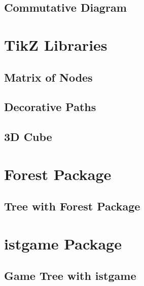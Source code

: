 \documentclass{beamer}
\begin{document}
\subsection{Commutative Diagram}



\section{TikZ Libraries}
\subsection{Matrix of Nodes}

\subsection{Decorative Paths}

\subsection{3D Cube}



\section{Forest Package}
\subsection{Tree with Forest Package}



\section{istgame Package}
\subsection{Game Tree with istgame}


\end{document}
